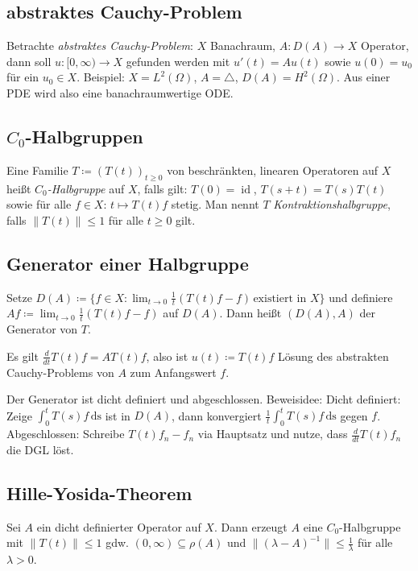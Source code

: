 \documentclass[11pt,a4paper]{scrartcl}
\theoremstyle{plain}
\theoremstyle{definition}
\theoremstyle{remark}
\DeclareMathOperator{\id}{id}
\begin{document}
\subsection{abstraktes Cauchy-Problem}

Betrachte \emph{abstraktes Cauchy-Problem}: $X$ Banachraum, $A:D(A) \to X$ Operator, dann soll $u: [0,\infty) \to X$ gefunden werden mit $u'(t) = Au(t)$ sowie $u(0)=u_0$ für ein $u_0\in X$. Beispiel: $X=L^2(\Omega)$, $A=\triangle$, $D(A)=H^2(\Omega)$. Aus einer PDE wird also eine banachraumwertige ODE.

\subsection{$C_0$-Halbgruppen}

Eine Familie $T\coloneqq (T(t))_{t\geq 0}$ von beschränkten, linearen Operatoren auf $X$ heißt \emph{$C_0$-Halbgruppe} auf $X$, falls gilt: $T(0)=\id$, $T(s+t)=T(s)T(t)$ sowie für alle $f\in X$: $t\mapsto T(t)f$ stetig. Man nennt $T$ \emph{Kontraktionshalbgruppe}, falls $\|T(t)\| \leq 1$ für alle $t\geq 0$ gilt.

\subsection{Generator einer Halbgruppe}

Setze $D(A)\coloneqq \{ f\in X: \lim_{t\to 0} \frac{1}{t}(T(t)f-f) \, \text{existiert in } X \}$ und definiere $Af \coloneqq \lim_{t\to 0} \frac{1}{t}(T(t)f-f)$ auf $D(A)$. Dann heißt $(D(A),A)$ der Generator von $T$.

Es gilt $\frac{d}{dt} T(t)f = AT(t)f$, also ist $u(t)\coloneqq T(t)f$ Lösung des abstrakten Cauchy-Problems von $A$ zum Anfangswert $f$.

Der Generator ist dicht definiert und abgeschlossen. Beweisidee: Dicht definiert: Zeige $\int_0^t T(s)f \, \mathrm{ds}$ ist in $D(A)$, dann konvergiert $\frac{1}{t} \int_0^t T(s)f \, \mathrm{ds}$ gegen $f$. Abgeschlossen: Schreibe $T(t)f_n-f_n$ via Hauptsatz und nutze, dass $\frac{d}{dt} T(t)f_n$ die DGL löst.

\subsection{Hille-Yosida-Theorem}

Sei $A$ ein dicht definierter Operator auf $X$. Dann erzeugt $A$ eine $C_0$-Halbgruppe mit $\|T(t)\| \leq 1$ gdw. $(0,\infty) \subseteq \rho(A)$ und $\|(\lambda-A)^{-1}\| \leq \frac{1}{\lambda}$ für alle $\lambda > 0$. 
\end{document}
